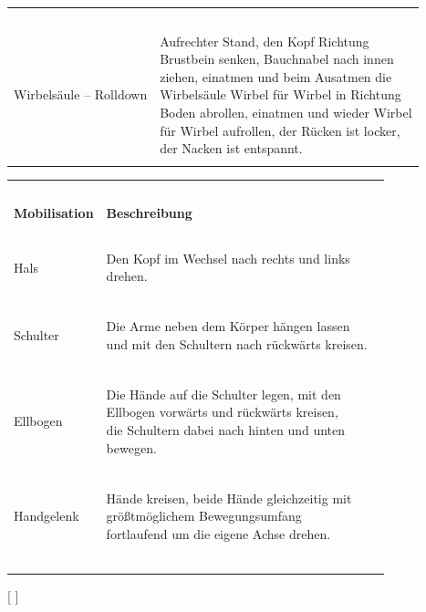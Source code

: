 \documentclass[FIPLY_base.tex]{subfiles}
\begin{document}
\begin{center}
\begin{tabular}{ p{5cm} | p{8cm} }
					\\ \hline
					\ \\
					Wirbelsäule – Rolldown & \pbox{10cm}{Aufrechter Stand, den Kopf Richtung \newline Brustbein senken, Bauchnabel nach innen \newline ziehen, einatmen und beim Ausatmen die \newline Wirbelsäule Wirbel für Wirbel in Richtung \newline Boden abrollen, einatmen und wieder Wirbel \newline für Wirbel aufrollen, der Rücken ist locker, \newline der Nacken ist entspannt.}
					\ \\
					\\ \hline
				\end{tabular} 
			\end{center}
			\begin{center}
				\begin{tabular}{ p{5cm} | p{8cm} }
					\hline
					\ \\
					\textbf{Mobilisation} & \textbf{Beschreibung}     
					\\ \hline \hline
					\ \\
					Hals & \pbox{10cm}
					{Den Kopf im Wechsel nach rechts und links \newline drehen.}
					\ \\ 
					\\ \hline
					\ \\ 					
					Schulter & \pbox{10cm}{Die Arme neben dem Körper hängen lassen \newline und mit den Schultern nach rückwärts kreisen.}
					\ \\ 
					\\ \hline
					\ \\
					Ellbogen & \pbox{10cm}{Die Hände auf die Schulter legen, mit den\newline Ellbogen vorwärts und rückwärts kreisen, \newline die Schultern dabei nach hinten und unten \newline bewegen.}
					\ \\ 
					\\ \hline
					\ \\ 
					Handgelenk & \pbox{10cm}{Hände kreisen, beide Hände gleichzeitig mit \newline größtmöglichem Bewegungsumfang \newline fortlaufend um die eigene Achse drehen.}
					\ \\ 
					\\ \hline
					\ \\ 
				\end{tabular} 
			\end{center}

[ \cite{tplantheorie}]
\end{document}
